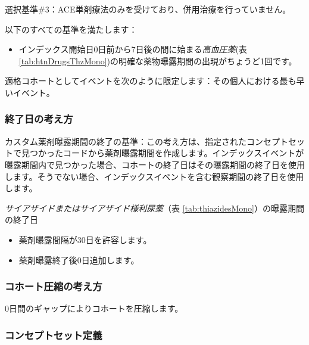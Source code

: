 \documentclass[
  11pt]{book}
\providecommand{\tightlist}{%
  \setlength{\itemsep}{0pt}\setlength{\parskip}{0pt}}
\theoremstyle{definition}
\theoremstyle{definition}
\theoremstyle{definition}
\theoremstyle{definition}
\theoremstyle{remark}
\begin{document}
選択基準\#3：ACE単剤療法のみを受けており、併用治療を行っていません。

以下のすべての基準を満たします：

\begin{itemize}
\tightlist
\item
  インデックス開始日0日前から7日後の間に始まる\emph{高血圧薬}(表 \ref{tab:htnDrugsThzMono})の明確な薬物曝露期間の出現がちょうど1回です。
\end{itemize}

適格コホートとしてイベントを次のように限定します：その個人における最も早いイベント。

\subsubsection*{終了日の考え方}\label{ux7d42ux4e86ux65e5ux306eux8003ux3048ux65b9-4}

カスタム薬剤曝露期間の終了の基準：この考え方は、指定されたコンセプトセットで見つかったコードから薬剤曝露期間を作成します。インデックスイベントが曝露期間内で見つかった場合、コホートの終了日はその曝露期間の終了日を使用します。そうでない場合、インデックスイベントを含む観察期間の終了日を使用します。

\emph{サイアザイドまたはサイアザイド様利尿薬}（表 \ref{tab:thiazidesMono}）の曝露期間の終了日

\begin{itemize}
\tightlist
\item
  薬剤曝露間隔が30日を許容します。
\item
  薬剤曝露終了後0日追加します。
\end{itemize}

\subsubsection*{コホート圧縮の考え方}\label{ux30b3ux30dbux30fcux30c8ux5727ux7e2eux306eux8003ux3048ux65b9-4}

0日間のギャップによりコホートを圧縮します。

\subsubsection*{コンセプトセット定義}\label{ux30b3ux30f3ux30bbux30d7ux30c8ux30bbux30c3ux30c8ux5b9aux7fa9-4}
\end{document}
